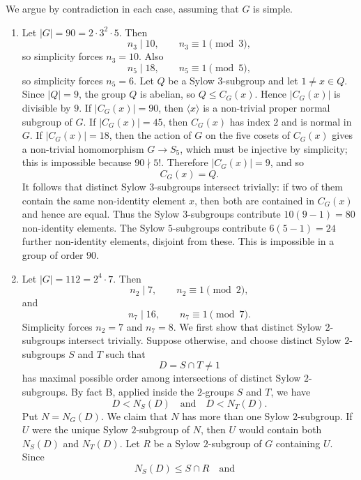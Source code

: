 \documentclass[../Odyssey_Project.tex]{subfiles}
\begin{document}
\begin{solution}
    We argue by contradiction in each case, assuming that $G$ is simple.
    \phantom{}\par
    \begin{enumerate}
        \item[(a)] Let $|G|=90=2\cdot 3^2\cdot 5$. Then
        \[
            n_3\mid 10,\qquad n_3\equiv 1\pmod 3,
        \]
        so simplicity forces $n_3=10$. Also
        \[
            n_5\mid 18,\qquad n_5\equiv 1\pmod 5,
        \]
        so simplicity forces $n_5=6$. Let $Q$ be a Sylow $3$-subgroup and let $1\neq x\in Q$. Since $|Q|=9$, the group $Q$ is abelian, so $Q\leq C_G(x)$. Hence $|C_G(x)|$ is divisible by $9$. If $|C_G(x)|=90$, then $\langle x\rangle$ is a non-trivial proper normal subgroup of $G$. If $|C_G(x)|=45$, then $C_G(x)$ has index $2$ and is normal in $G$. If $|C_G(x)|=18$, then the action of $G$ on the five cosets of $C_G(x)$ gives a non-trivial homomorphism $G\to S_5$, which must be injective by simplicity; this is impossible because $90\nmid 5!$. Therefore $|C_G(x)|=9$, and so
        \[
            C_G(x)=Q.
        \]
        It follows that distinct Sylow $3$-subgroups intersect trivially: if two of them contain the same non-identity element $x$, then both are contained in $C_G(x)$ and hence are equal. Thus the Sylow $3$-subgroups contribute $10(9-1)=80$ non-identity elements. The Sylow $5$-subgroups contribute $6(5-1)=24$ further non-identity elements, disjoint from these. This is impossible in a group of order $90$.
        \item[(b)] Let $|G|=112=2^4\cdot 7$. Then
        \[
            n_2\mid 7,\qquad n_2\equiv 1\pmod 2,
        \]
        and
        \[
            n_7\mid 16,\qquad n_7\equiv 1\pmod 7.
        \]
        Simplicity forces $n_2=7$ and $n_7=8$. We first show that distinct Sylow $2$-subgroups intersect trivially. Suppose otherwise, and choose distinct Sylow $2$-subgroups $S$ and $T$ such that
        \[
            D=S\cap T\neq 1
        \]
        has maximal possible order among intersections of distinct Sylow $2$-subgroups. By fact B, applied inside the $2$-groups $S$ and $T$, we have
        \[
            D<N_S(D)
            \quad\text{and}\quad
            D<N_T(D).
        \]
        Put $N=N_G(D)$. We claim that $N$ has more than one Sylow $2$-subgroup. If $U$ were the unique Sylow $2$-subgroup of $N$, then $U$ would contain both $N_S(D)$ and $N_T(D)$. Let $R$ be a Sylow $2$-subgroup of $G$ containing $U$. Since
        \[
            N_S(D)\leq S\cap R
            \quad\text{and}\quad
\]
\end{enumerate}
\end{solution}
\end{document}
